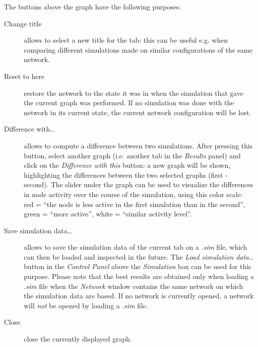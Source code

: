 \documentclass{article}
\begin{document}
The buttons above the graph have the following purposes:
\begin{description}
  \item[Change title] allows to select a new title for the tab: this can be useful e.g. when comparing different
simulations made on similar configurations of the same network.
  \item[Reset to here] restore the network to the state it was in when the simulation that gave the current graph was performed.
If no simulation was done with the network in its current state, the current network configuration will be lost.
  \item[Difference with\dots] allows to compute a difference between two simulations. After pressing this button, select another
graph (i.e. another tab in the \emph{Results} panel) and click on the \emph{Difference with this} button: a new graph will be shown,
highlighting the differences between the two selected graphs (first - second). The slider under the graph can be used
to visualize the differences in node activity over the course of the simulation, using this color scale: red = ``the
node is less active in the first simulation than in the second'', green = ``more active'', white = ``similar activity level''.
  \item[Save simulation data\dots] allows to save
the simulation data of the current tab on a \emph{.sim} file, which can then be loaded and inspected in the future.
The \emph{Load simulation data\dots} button in the \emph{Control Panel} above the \emph{Simulation} box can be used for this purpose.
Please note that the best results are obtained only when loading a \emph{.sim} file when the \emph{Network} window contains the same network
on which the simulation data are based. If no network is currently opened, a network will \emph{not} be opened by loading a \emph{.sim} file.
  \item[Close] close the currently displayed graph.
\end{description}
\end{document}
